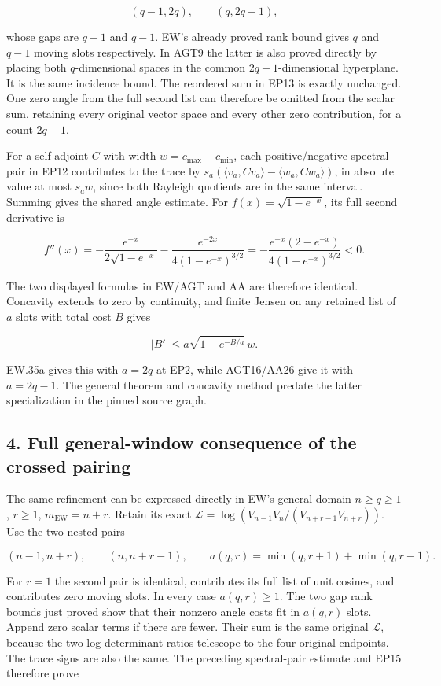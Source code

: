 \[
(q-1,2q),\qquad(q,2q-1),
\tag{EP14}
\]

whose gaps are \(q+1\) and \(q-1\). EW's already proved rank bound gives \(q\) and \(q-1\) moving slots respectively. In AGT9 the latter is also proved directly by placing both \(q\)-dimensional spaces in the common \(2q-1\)-dimensional hyperplane. It is the same incidence bound. The reordered sum in EP13 is exactly unchanged. One zero angle from the full second list can therefore be omitted from the scalar sum, retaining every original vector space and every other zero contribution, for a count \(2q-1\).

For a self-adjoint \(C\) with width \(w=c_{\max}-c_{\min}\), each positive/negative spectral pair in EP12 contributes to the trace by \(s_a(\langle v_a,Cv_a\rangle-\langle w_a,Cw_a\rangle)\), in absolute value at most \(s_aw\), since both Rayleigh quotients are in the same interval. Summing gives the shared angle estimate. For \(f(x)=\sqrt{1-e^{-x}}\), its full second derivative is

\[
f''(x)=-\frac{e^{-x}}{2\sqrt{1-e^{-x}}}
-\frac{e^{-2x}}{4(1-e^{-x})^{3/2}}
=-\frac{e^{-x}(2-e^{-x})}{4(1-e^{-x})^{3/2}}<0.
\tag{EP15}
\]

The two displayed formulas in EW/AGT and AA are therefore identical. Concavity extends to zero by continuity, and finite Jensen on any retained list of \(a\) slots with total cost \(B\) gives

\[
|B'|\le a\sqrt{1-e^{-B/a}}\,w.
\tag{EP16}
\]

EW.35a gives this with \(a=2q\) at EP2, while AGT16/AA26 give it with \(a=2q-1\). The general theorem and concavity method predate the latter specialization in the pinned source graph.

\subsection{4. Full general-window consequence of the crossed pairing}\label{full-general-window-consequence-of-the-crossed-pairing}

The same refinement can be expressed directly in EW's general domain \(n\ge q\ge1\), \(r\ge1\), \(m_{\mathrm{EW}}=n+r\). Retain its exact \(\mathscr L=\log(V_{n-1}V_n/(V_{n+r-1}V_{n+r}))\). Use the two nested pairs

\[
(n-1,n+r),\qquad(n,n+r-1),\qquad
a(q,r)=\min(q,r+1)+\min(q,r-1).
\tag{EP17}
\]

For \(r=1\) the second pair is identical, contributes its full list of unit cosines, and contributes zero moving slots. In every case \(a(q,r)\ge1\). The two gap rank bounds just proved show that their nonzero angle costs fit in \(a(q,r)\) slots. Append zero scalar terms if there are fewer. Their sum is the same original \(\mathscr L\), because the two log determinant ratios telescope to the four original endpoints. The trace signs are also the same. The preceding spectral-pair estimate and EP15 therefore prove

